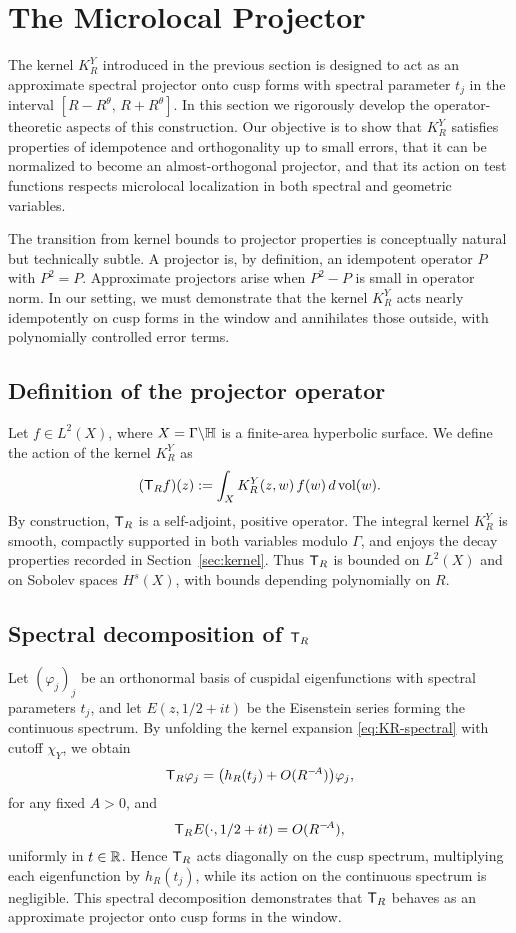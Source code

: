 \section{The Microlocal Projector}\label{sec:projector}

The kernel $K_R^Y$ introduced in the previous section is designed to act as an approximate spectral projector onto cusp forms with spectral parameter $t_j$ in the interval $[R-R^\theta,\,R+R^\theta]$. In this section we rigorously develop the operator-theoretic aspects of this construction. Our objective is to show that $K_R^Y$ satisfies properties of idempotence and orthogonality up to small errors, that it can be normalized to become an almost-orthogonal projector, and that its action on test functions respects microlocal localization in both spectral and geometric variables.

The transition from kernel bounds to projector properties is conceptually natural but technically subtle. A projector is, by definition, an idempotent operator $P$ with $P^2=P$. Approximate projectors arise when $P^2-P$ is small in operator norm. In our setting, we must demonstrate that the kernel $K_R^Y$ acts nearly idempotently on cusp forms in the window and annihilates those outside, with polynomially controlled error terms.

\subsection{Definition of the projector operator}\label{subsec:proj-def}

Let $f\in L^2(X)$, where $X=\Gamma\backslash\mathbb{H}$ is a finite-area hyperbolic surface. We define the action of the kernel $K_R^Y$ as
\[
(\mathsf{T}_R f)(z) := \int_X K_R^Y(z,w)\,f(w)\,d\operatorname{vol}(w).
\]
By construction, $\mathsf{T}_R$ is a self-adjoint, positive operator. The integral kernel $K_R^Y$ is smooth, compactly supported in both variables modulo $\Gamma$, and enjoys the decay properties recorded in Section~\ref{sec:kernel}. Thus $\mathsf{T}_R$ is bounded on $L^2(X)$ and on Sobolev spaces $H^s(X)$, with bounds depending polynomially on $R$.

\subsection{Spectral decomposition of $\mathsf{T}_R$}\label{subsec:proj-spectrum}

Let $(\varphi_j)_j$ be an orthonormal basis of cuspidal eigenfunctions with spectral parameters $t_j$, and let $E(z,1/2+it)$ be the Eisenstein series forming the continuous spectrum. By unfolding the kernel expansion \eqref{eq:KR-spectral} with cutoff $\chi_Y$, we obtain
\[
\mathsf{T}_R \varphi_j = \big(h_R(t_j) + O(R^{-\!A})\big)\varphi_j,
\]
for any fixed $A>0$, and
\[
\mathsf{T}_R E(\cdot,1/2+it) = O(R^{-\!A}),
\]
uniformly in $t\in\mathbb{R}$. Hence $\mathsf{T}_R$ acts diagonally on the cusp spectrum, multiplying each eigenfunction by $h_R(t_j)$, while its action on the continuous spectrum is negligible. This spectral decomposition demonstrates that $\mathsf{T}_R$ behaves as an approximate projector onto cusp forms in the window.

